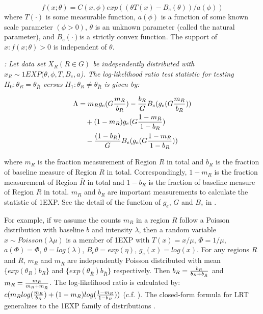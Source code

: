\documentclass[AMA,LATO1COL]{WileyNJD-v2}
\begin{document}
\begin{equation}
f(x; \theta )=C(x,\phi)exp((\theta T(x)-B_e(\theta))/a(\phi))
\label{oneexp}
\end{equation}
where  $T(\cdot)$ is some measurable function, $a(\phi)$ is a function of some known scale parameter $(\phi>0)$, $\theta$ is an unknown parameter (called the natural parameter), and $B_e(\cdot)$is a strictly convex function. The support of ${x:f(x;\theta)>0}$ is independent of $\theta$.

\begin{theorem}\label{thm1}
{\it\cite{DagMaxmize}:}
{\it Let data set $X_R (R\in G)$ be independently distributed with $x_R\sim 1EXP(\theta,\phi,T,B_e,a$). The log-likelihood ratio test statistic for testing $H_{0}: \theta_R = \theta_{\bar R}$ versus $H_{1}: \theta_R \neq \theta_{\bar R}$ is given by:}

\begin{eqnarray}
\Lambda&={m_R}g_e({G{m_R\over b_R}})-{b_R\over G} {B_e(g_e(G{m_R\over b_R}))}\\&\quad +(1-m_R)g_e({G{1-m_R\over {1-b_R}}})\\&\quad-{(1-b_R)\over G}{B_e(g_e({G{1-m_R\over {1-b_R}}}))}
\label{eq}
\end{eqnarray}
\label{thm1}
\end{theorem}

where $m_R$ is the fraction measurement of Region $R$ in total and $b_R$ is the fraction of baseline measure of Region $R$ in total. Correspondingly, $1-m_R$ is the fraction measurement of Region $\bar R$ in total and $1-b_R$ is the fraction of baseline measure of Region $R$ in total. $m_R$  and $b_R$ are important measurements to calculate the statistic of 1EXP. See the detail of the function of $g_e$, $G$ and $B_e$ in \cite{DagMaxmize}.

For example, if we assume the counts $m_R$ in a region $R$ follow a Poisson distribution with baseline $b$ and intensity $\lambda$, then  a random variable $x \sim Poisson(\lambda \mu)$ is a member of 1EXP with $T(x)=x/\mu$, $\Phi=1/\mu$, $a(\Phi)=\Phi$, $\theta=log(\lambda)$, $B_e{\theta}=exp(\eta)$, $g_e{(x)}=log(x)$. For any regions $R$ and $\bar R$, $m_R$ and $m_{\bar R}$ are independently Poisson distributed with mean $\{exp(\theta_R)b_R\}$ and $\{exp(\theta_{\bar R})b_{\bar R}\}$ respectively. Then $b_R={b_R\over {b_R+b_{\bar R}}}$ and $m_R={m_R\over {m_R+m_{\bar R}}}$. The log-likelihood ratio is calculated by: $c(m_R log ({m_R\over {b_R}})+ (1-m_R)log({{1-m_R}\over {1-b_R} }))$ (c.f. \cite{DagMaxmize}). The closed-form formula for LRT generalizes to the 1EXP family of distributions \cite{DagMaxmize}.
\end{document}
